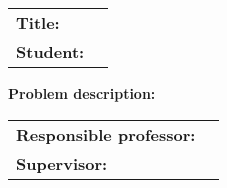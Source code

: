 


\begin{titlingpage}

\noindent
\begin{tabular}{@{}p{4cm}l}
\textbf{Title:} 	& \thetitle \\
\textbf{Student:}	& \theauthor \\
\end{tabular}

\vspace{4ex}
\noindent\textbf{Problem description:}
\vspace{2ex}

\noindent \Blindtext[2][1]
\vspace{6ex}

\noindent
\begin{tabular}{@{}p{4cm}l}
\textbf{Responsible professor:} 	& \theprofessor \\
\textbf{Supervisor:}			& \thesupervisor \\
\end{tabular}

\end{titlingpage}
